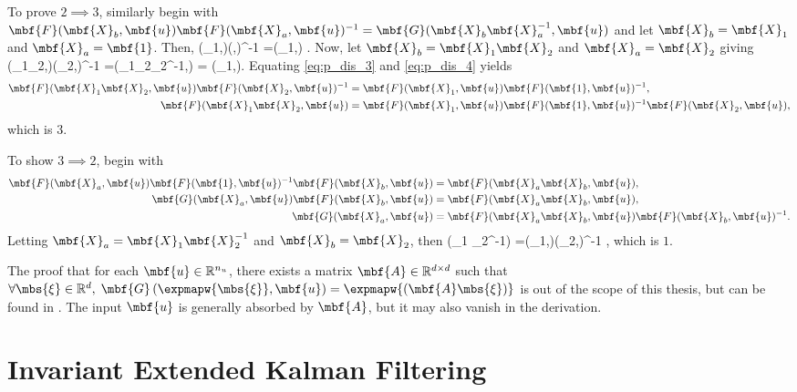 To prove $2 \implies 3$, similarly begin with  $\mbf{F}(\mbf{X}_b,\mbf{u})\mbf{F}(\mbf{X}_a,\mbf{u})^{-1} =\mbf{G}(\mbf{X}_b\mbf{X}_a^{-1},\mbf{u})$ and let $\mbf{X}_b = \mbf{X}_1$ and $\mbf{X}_a = \mbf{1}$. Then,
\beq
	(_1,)(,)^{-1} =(_1,) \label{eq:p_dis_3}.
\eeq
Now, let  $\mbf{X}_b = \mbf{X}_1\mbf{X}_2$ and $\mbf{X}_a = \mbf{X}_2$ giving
\beq
	(_1_2,)(_2,)^{-1}  =(_1_2_2^{-1},) = (_1,)\label{eq:p_dis_4}.
\eeq
Equating \eqref{eq:p_dis_3} and \eqref{eq:p_dis_4} yields
\begin{align}
	\mbf{F}(\mbf{X}_1\mbf{X}_2,\mbf{u})\mbf{F}(\mbf{X}_2,\mbf{u})^{-1}  & =\mbf{F}(\mbf{X}_1,\mbf{u})\mbf{F}(\mbf{1},\mbf{u})^{-1}, \notag \\
	\mbf{F}(\mbf{X}_1\mbf{X}_2,\mbf{u}) & =\mbf{F}(\mbf{X}_1,\mbf{u})\mbf{F}(\mbf{1},\mbf{u})^{-1}\mbf{F}(\mbf{X}_2,\mbf{u})\notag,
\end{align}
which is $3$.

To show $3 \implies 2$, begin with
\begin{align}
	\mbf{F}(\mbf{X}_a,\mbf{u})\mbf{F}(\mbf{1},\mbf{u})^{-1}\mbf{F}(\mbf{X}_b,\mbf{u}) & =\mbf{F}(\mbf{X}_a\mbf{X}_b,\mbf{u}), \notag \\
	\mbf{G}(\mbf{X}_a,\mbf{u})\mbf{F}(\mbf{X}_b,\mbf{u}) & =\mbf{F}(\mbf{X}_a\mbf{X}_b,\mbf{u}), \notag \\
	\mbf{G}(\mbf{X}_a,\mbf{u}) & =\mbf{F}(\mbf{X}_a\mbf{X}_b,\mbf{u})\mbf{F}(\mbf{X}_b,\mbf{u})^{-1} . \notag
\end{align}
Letting $\mbf{X}_a = \mbf{X}_1 \mbf{X}_2^{-1}$ and $\mbf{X}_b = \mbf{X}_2$, then
\bdis
	\left(_1 _2^{-1}\right) =(_1,)(_2,)^{-1} ,
\edis
which is $1$.

The proof that for each $\mbf{u} \in\mathbb{R}^{n_u}$, there exists a matrix $\mbf{A} \in \mathbb{R}^{d \times d}$  such that $\forall \mbs{\xi} \in \mathbb{R}^d, \;\mbf{G}\left(\expmapw{\mbs{\xi}},\mbf{u}\right) = \expmapw{\left(\mbf{A} \mbs{\xi}\right)}$ is out of the scope of this thesis, but can be found in \cite{Barrau2017}. The input $\mbf{u}$ is generally absorbed by $\mbf{A}$, but it may also vanish in the derivation. 



\section{Invariant Extended Kalman Filtering}

